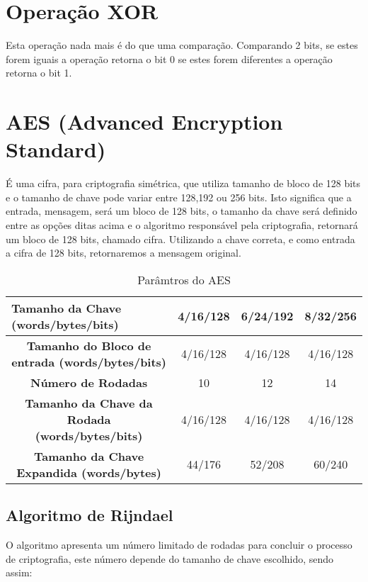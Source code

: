 \section{Operação XOR}

Esta operação nada mais é do que uma comparação. Comparando 2 bits, se estes forem iguais a operação retorna o bit 0 se estes forem diferentes a operação retorna o bit 1.

	
	
	\section{AES (Advanced Encryption Standard)}

	É uma cifra, para criptografia simétrica, que utiliza tamanho de bloco de 128 bits e o tamanho de chave pode variar entre 128,192 ou 256 bits. Isto significa que a entrada, mensagem, será um bloco de 128 bits, o tamanho da chave será definido entre as opções ditas acima e o algoritmo responsável pela criptografia, retornará um bloco de 128 bits, chamado cifra. Utilizando a chave correta, e como entrada a cifra de 128 bits, retornaremos a mensagem original.
	
		\begin{table}[tbh]
		\centering
		\caption{Parâmtros do AES}
		\label{tab1}
		\begin{tabular}{|c|c|c|c|}
			\hline
			\multicolumn{1}{|l|}{\textbf{Tamanho da Chave (words/bytes/bits)}} & 4/16/128 & 6/24/192 & 8/32/256 \\ \hline
			\textbf{Tamanho do Bloco de entrada (words/bytes/bits)}            & 4/16/128 & 4/16/128 & 4/16/128 \\ \hline
			\textbf{Número de Rodadas}                                         & 10       & 12       & 14       \\ \hline
			\textbf{Tamanho da Chave da Rodada (words/bytes/bits)}             & 4/16/128 & 4/16/128 & 4/16/128 \\ \hline
			\textbf{Tamanho da Chave Expandida (words/bytes)}                  & 44/176   & 52/208   & 60/240   \\ \hline
		\end{tabular}
	\end{table}
	
	
	\subsection{Algoritmo de Rijndael}
	
	O algoritmo apresenta um número limitado de rodadas para concluir o processo de criptografia, este número depende do tamanho de chave escolhido, sendo assim:
	
